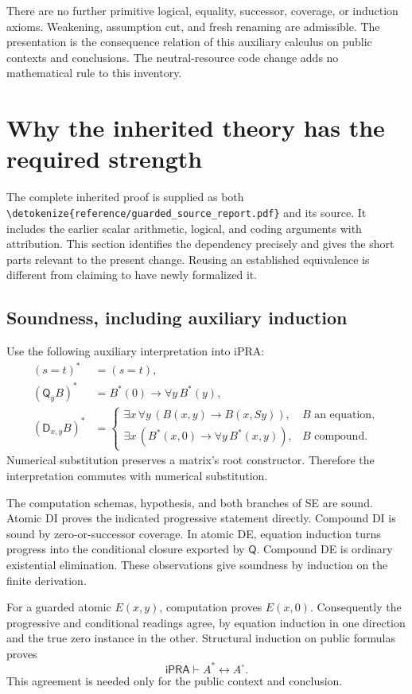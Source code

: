 \documentclass[11pt,letterpaper]{article}
\theoremstyle{definition}
\theoremstyle{remark}
\newcommand{\ipra}{\mathsf{iPRA}}
\newcommand{\D}{\mathsf D}
\newcommand{\Q}{\mathsf Q}
\newcommand{\file}[1]{\expandafter\nolinkurl\expandafter{\detokenize{#1}}}
\begin{document}
There are no further primitive logical, equality, successor, coverage,
or induction axioms. Weakening, assumption cut, and fresh renaming are
admissible. The presentation is the consequence relation of this auxiliary
calculus on public contexts and conclusions. The neutral-resource code
change adds no mathematical rule to this inventory.

\section{Why the inherited theory has the required strength}
\label{sec:equivalence}

The complete inherited proof is supplied as both
\file{reference/guarded_source_report.pdf} and its source. It includes the
earlier scalar arithmetic, logical, and coding arguments with attribution.
This section identifies the dependency precisely and gives the short
parts relevant to the present change. Reusing an established equivalence
is different from claiming to have newly formalized it.

\subsection{Soundness, including auxiliary induction}

Use the following auxiliary interpretation into iPRA:
\begin{align*}
 (s=t)^*&=(s=t),\\
 (\Q_yB)^*&=B^*(0)\to\forall y\,B^*(y),\\
 (\D_{x,y}B)^*&=
 \begin{cases}
 \exists x\,\forall y\,(B(x,y)\to B(x,Sy)),&B\text{ an equation},\\
 \exists x\,(B^*(x,0)\to\forall y\,B^*(x,y)),&B\text{ compound}.
 \end{cases}
\end{align*}
Numerical substitution preserves a matrix's root constructor. Therefore
the interpretation commutes with numerical substitution.

The computation schemas, hypothesis, and both branches of SE are sound.
Atomic DI proves the indicated progressive statement directly. Compound
DI is sound by zero-or-successor coverage. In atomic DE, equation induction
turns progress into the conditional closure exported by $\Q$. Compound
DE is ordinary existential elimination. These observations give soundness
by induction on the finite derivation.

For a guarded atomic $E(x,y)$, computation proves $E(x,0)$. Consequently
the progressive and conditional readings agree, by equation induction in
one direction and the true zero instance in the other. Structural
induction on public formulas proves
\[
 \ipra\vdash A^*\leftrightarrow A^\circ.
\]
This agreement is needed only for the public context and conclusion.
\end{document}
